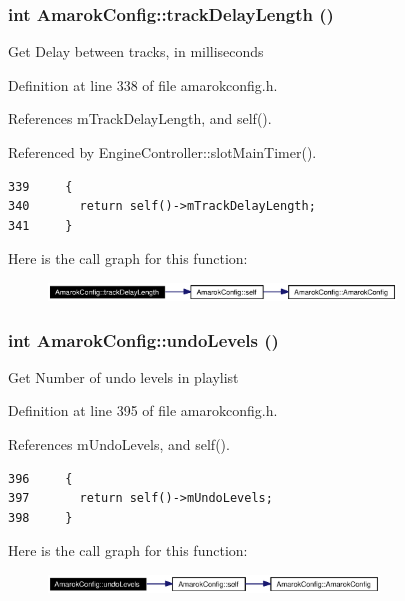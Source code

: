 \subsubsection{\setlength{\rightskip}{0pt plus 5cm}int Amarok\-Config::track\-Delay\-Length ()\hspace{0.3cm}{\tt  [inline, static]}}\label{classAmarokConfig_AmarokConfige34}


Get Delay between tracks, in milliseconds 

Definition at line 338 of file amarokconfig.h.

References m\-Track\-Delay\-Length, and self().

Referenced by Engine\-Controller::slot\-Main\-Timer().



\footnotesize\begin{verbatim}339     {
340       return self()->mTrackDelayLength;
341     }
\end{verbatim}\normalsize 


Here is the call graph for this function:\begin{figure}[H]
\begin{center}
\leavevmode
\includegraphics[width=262pt]{classAmarokConfig_AmarokConfige34_cgraph}
\end{center}
\end{figure}
\subsubsection{\setlength{\rightskip}{0pt plus 5cm}int Amarok\-Config::undo\-Levels ()\hspace{0.3cm}{\tt  [inline, static]}}\label{classAmarokConfig_AmarokConfige40}


Get Number of undo levels in playlist 

Definition at line 395 of file amarokconfig.h.

References m\-Undo\-Levels, and self().



\footnotesize\begin{verbatim}396     {
397       return self()->mUndoLevels;
398     }
\end{verbatim}\normalsize 


Here is the call graph for this function:\begin{figure}[H]
\begin{center}
\leavevmode
\includegraphics[width=249pt]{classAmarokConfig_AmarokConfige40_cgraph}
\end{center}
\end{figure}
